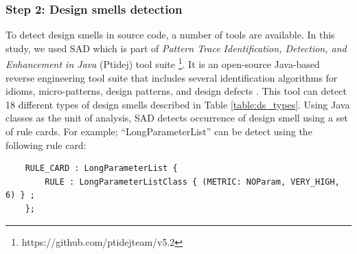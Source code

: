 \documentclass[AMA,Times1COL]{WileyNJDv5} %
\begin{document}
\subsubsection*{Step 2: Design smells detection}
To detect design smells in source code, a number of tools are available. In this study, we used SAD which is part of  \textit{Pattern Trace Identification, Detection, and Enhancement in Java} (Ptidej) tool suite \footnote{https://github.com/ptidejteam/v5.2}. It is an open-source Java-based reverse engineering tool suite that includes several identification algorithms for idioms, micro-patterns, design patterns, and design defects \cite{gueheneuc2007ptidej}. This tool can detect 18 different types of design smells described in Table \ref{table:ds_types}. Using Java classes as the unit of analysis, SAD detects occurrence of design smell using a set of rule cards. For example; ``LongParameterList'' can be detect using the following rule card:
\begin{verbatim}
	RULE_CARD : LongParameterList { 
		RULE : LongParameterListClass { (METRIC: NOParam, VERY_HIGH, 6) } ; 
	};
\end{verbatim}
\end{document}
